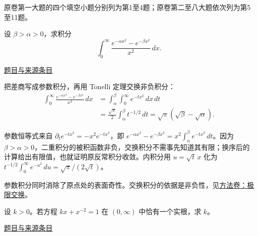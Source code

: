 \documentclass[UTF8,12pt,a4paper,fontset=fandol]{ctexart}
\begin{document}
\begin{remark}[来源说明]原卷第一大题的四个填空小题分别列为第1至4题；原卷第二至八大题依次列为第5至11题。\end{remark}

\begin{example}[来源序号1]\label{ex:fin01-all:1}\label{pr:fin01-all:1}

设 $\beta>\alpha>0$，求积分
\[
\int_0^\infty\frac{e^{-\alpha x^2}-e^{-\beta x^2}}{x^2}\,dx.
\]

\par\href{https://github.com/lzxcr/cmc-mathematics/blob/64916fa1fdbc3e444a652eca204d5669058ee321/src/problems/finals/01/01.md}{题目与来源条目}

\end{example}

\begin{solve}\label{ans:fin01-all:1}

把差商写成参数积分，再用 Tonelli 定理交换非负积分：
\[
\begin{aligned}
\int_0^\infty\frac{e^{-\alpha x^2}-e^{-\beta x^2}}{x^2}\,dx
&=\int_\alpha^\beta\int_0^\infty e^{-t x^2}\,dx\,dt\\
&=\frac{\sqrt\pi}{2}\int_\alpha^\beta t^{-1/2}\,dt
=\sqrt\pi(\sqrt\beta-\sqrt\alpha).
\end{aligned}
\]

参数恒等式来自 $\partial_t e^{-tx^2}=-x^2e^{-tx^2}$，即 $e^{-\alpha x^2}-e^{-\beta x^2}=x^2\int_\alpha^\beta e^{-tx^2}\,dt$。因为 $\beta>\alpha>0$，二重积分的被积函数非负，交换积分不需事先知道其有限；换序后的计算给出有限值，也就证明原反常积分收敛。内积分用 $u=\sqrt t\,x$ 化为 $t^{-1/2}\int_0^\infty e^{-u^2}\,du=\sqrt\pi/(2\sqrt t)$。

\end{solve}

\begin{remark}[方法与条件]参数积分同时消除了原点处的表面奇性。交换积分的依据是非负性，见\hyperref[app:integration-exchange]{方法卷：极限交换}。\end{remark}

\begin{example}[来源序号2]\label{ex:fin01-all:2}\label{pr:fin01-all:2}

设 $k>0$。若方程 $kx+x^{-2}=1$ 在 $(0,\infty)$ 中恰有一个实根，求 $k$。

\par\href{https://github.com/lzxcr/cmc-mathematics/blob/64916fa1fdbc3e444a652eca204d5669058ee321/src/problems/finals/01/02.md}{题目与来源条目}

\end{example}
\end{document}
